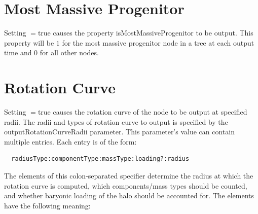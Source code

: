 \section{Most Massive Progenitor}

Setting {\normalfont \ttfamily [outputMostMassiveProgenitor]}$=${\normalfont \ttfamily true} causes the property {\normalfont \ttfamily isMostMassiveProgenitor} to be output. This property will be $1$ for the most massive progenitor node in a tree at each output time and $0$ for all other nodes.

\section{Rotation Curve}

Setting {\normalfont \ttfamily [outputRotationCurveData]}$=${\normalfont \ttfamily true} causes the rotation curve of the node to be output at specified radii. The radii and types of rotation curve to output is specified by the {\normalfont \ttfamily outputRotationCurveRadii} parameter. This parameter's value can contain multiple entries. Each entry is of the form:
\begin{verbatim}
  radiusType:componentType:massType:loading?:radius
\end{verbatim}
The elements of this colon-separated specifier determine the radius at which the rotation curve is computed, which components/mass types should be counted, and whether baryonic loading of the halo should be accounted for. The elements have the following meaning:
